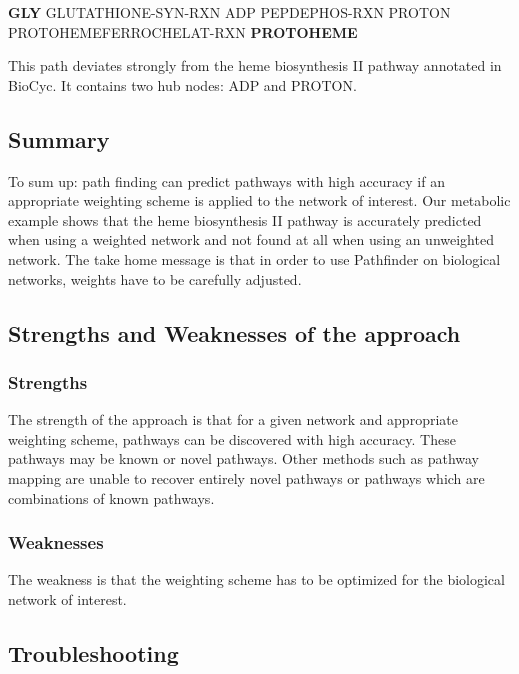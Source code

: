 \textbf{GLY} GLUTATHIONE-SYN-RXN ADP PEPDEPHOS-RXN PROTON PROTOHEMEFERROCHELAT-RXN \textbf{PROTOHEME} 	

This path deviates strongly from the heme biosynthesis II pathway annotated in BioCyc. It contains two hub nodes: ADP and PROTON.  

\subsection{Summary}

To sum up: path finding can predict pathways with high accuracy if an appropriate weighting scheme is applied to the network of interest. Our metabolic example shows that the heme biosynthesis II pathway is accurately predicted when using a weighted network and not found at all when using an unweighted network. The take home message is that in order to use Pathfinder on biological networks, weights have to be carefully adjusted.

\subsection{Strengths and Weaknesses of the approach}

\subsubsection{Strengths}
The strength of the approach is that for a given network and appropriate weighting scheme, pathways can be discovered with high accuracy. These pathways may be known or novel pathways. Other methods such as pathway mapping
are unable to recover entirely novel pathways or pathways which are combinations of known pathways.

\subsubsection{Weaknesses}
The weakness is that the weighting scheme has to be optimized for the biological network of interest.

\subsection{Troubleshooting}


